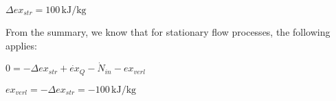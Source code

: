 \( \Delta ex_{str} = 100 \, \text{kJ/kg} \)  

From the summary, we know that for stationary flow processes, the following applies:  

\( 0 = -\Delta ex_{str} + \dot{ex}_Q - \dot{N}_{in} - ex_{verl} \)  

\( ex_{verl} = -\Delta ex_{str} = -100 \, \text{kJ/kg} \)